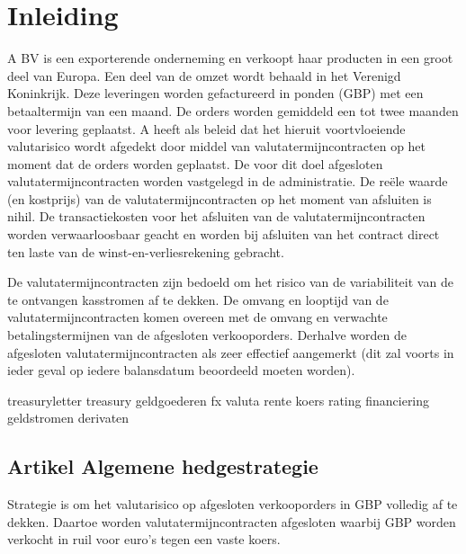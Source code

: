 

\setcounter{page}{2}

\section*{Inleiding}
A BV \citep{aoibsfc} is een exporterende onderneming en verkoopt haar producten in een groot deel van Europa. Een deel van de omzet wordt behaald in het Verenigd Koninkrijk. Deze leveringen worden gefactureerd in ponden (GBP) met een betaaltermijn van een maand. De orders worden gemiddeld een tot twee maanden voor levering geplaatst. A heeft als beleid dat het hieruit voortvloeiende valutarisico wordt afgedekt door middel van valutatermijncontracten op het moment dat de orders worden geplaatst. De voor dit doel afgesloten valutatermijncontracten worden vastgelegd in de administratie. De reële waarde (en kostprijs) van de valutatermijncontracten op het moment van afsluiten is nihil. De transactiekosten voor het afsluiten van de valutatermijncontracten worden verwaarloosbaar geacht en worden bij afsluiten van het contract direct ten laste van de winst-en-verliesrekening gebracht.

De valutatermijncontracten zijn bedoeld om het risico van de variabiliteit van de te ontvangen kasstromen af te dekken. De omvang en looptijd van de valutatermijncontracten komen overeen met de omvang en verwachte betalingstermijnen van de afgesloten verkooporders. Derhalve worden de afgesloten valutatermijncontracten als zeer effectief aangemerkt (dit zal voorts in ieder geval op iedere balansdatum beoordeeld moeten worden).


\printglossary[title=Begrippenkader]
\gls{treasuryletter} \gls{treasury} \gls{geldgoederen} \gls{fx} \gls{valuta} \gls{rente} \gls{koers} \gls{rating} \gls{financiering} \gls{geldstromen} \gls{derivaten}



\subsection*{Artikel \theartikel \hspace{1em} Algemene hedgestrategie}
Strategie is om het valutarisico op afgesloten verkooporders in GBP volledig af te dekken. Daartoe worden valutatermijncontracten afgesloten waarbij GBP worden verkocht in ruil voor euro’s tegen een vaste koers.


